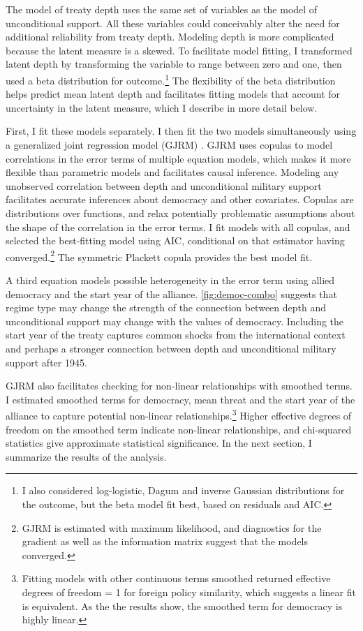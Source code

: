 \documentclass[12pt]{article}
\begin{document}
The model of treaty depth uses the same set of variables as the model of unconditional support. 
All these variables could conceivably alter the need for additional reliability from treaty depth. 
Modeling depth is more complicated because the latent measure is a skewed.
To facilitate model fitting, I transformed latent depth by transforming the variable to range between zero and one, then used a beta distribution for outcome.\footnote{I also considered log-logistic, Dagum and inverse Gaussian distributions for the outcome, but the beta model fit best, based on residuals and AIC.}
The flexibility of the beta distribution helps predict mean latent depth and facilitates fitting models that account for uncertainty in the latent measure, which I describe in more detail below. 


First, I fit these models separately. 
I then fit the two models simultaneously using a generalized joint regression model (GJRM) \citep{Braumoelleretal2018}.
GJRM uses copulas to model correlations in the error terms of multiple equation models, which makes it more flexible than parametric models and facilitates causal inference. 
Modeling any unobserved correlation between depth and unconditional military support facilitates accurate inferences about democracy and other covariates. 
Copulas are distributions over functions, and relax potentially problematic assumptions about the shape of the correlation in the error terms. 
I fit models with all copulas, and selected the best-fitting model using AIC, conditional on that estimator having converged.\footnote{GJRM is estimated with maximum likelihood, and diagnostics for the gradient as well as the information matrix suggest that the models converged.} 
The symmetric Plackett copula provides the best model fit.


A third equation models possible heterogeneity in the error term using allied democracy and the start year of the alliance. 
\autoref{fig:democ-combo} suggests that regime type may change the strength of the connection between depth and unconditional support may change with the values of democracy. 
Including the start year of the treaty captures common shocks from the international context and perhaps a stronger connection between depth and unconditional military support after 1945. 


GJRM also facilitates checking for non-linear relationships with smoothed terms. 
I estimated smoothed terms for democracy, mean threat and the start year of the alliance to capture potential non-linear relationships.\footnote{Fitting models with other continuous terms smoothed returned effective degrees of freedom = 1 for foreign policy similarity, which suggests a linear fit is equivalent. As the the results show, the smoothed term for democracy is highly linear.}  
Higher effective degrees of freedom on the smoothed term indicate non-linear relationships, and chi-squared statistics give approximate statistical significance. 
In the next section, I summarize the results of the analysis. 
\end{document}
